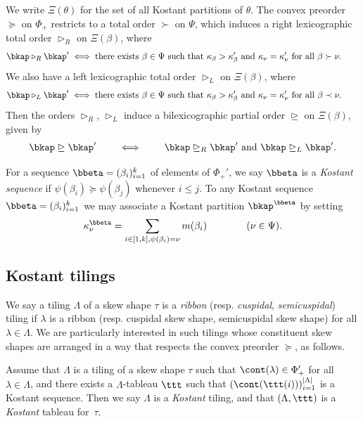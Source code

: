 We write \(\Xi(\theta)\) for the set of all Kostant partitions of \(\theta\).
The convex preorder \(\succeq\) on \(\Phi_+\) restricts to a total order \(\succ\) on \(\Psi\), which induces a right lexicographic total order \(\triangleright_R\) on \(\Xi(\beta)\), where
\begin{align*}
\bkap \triangleright_R \bkap'
\iff
\textup{there exists \(\beta \in \Psi\) such that }
\kappa_\beta > \kappa'_\beta \textup{ and } \kappa_\nu = \kappa'_\nu \textup{ for all } \beta \succ \nu.
\qquad
\end{align*}
We also have a 
left lexicographic total order \(\triangleright_L\) on \(\Xi(\beta)\), where
\begin{align*}
\bkap \triangleright_L \bkap'
\iff
\textup{there exists \(\beta \in \Psi\) such that }
\kappa_\beta > \kappa'_\beta \textup{ and } \kappa_\nu = \kappa'_\nu \textup{ for all } \beta \prec \nu.
\qquad
\end{align*}
Then the orders \(\triangleright_R\), \(\triangleright_L\) induce a bilexicographic partial order \(\trianglerighteq\) on \(\Xi(\beta)\), given by
\begin{align*}
\bkap \trianglerighteq \bkap'
\qquad
\iff
\qquad
\bkap \trianglerighteq_R \bkap'
\textup{ and }
\bkap \trianglerighteq_L \bkap'.
\end{align*}

For a sequence \(\bbeta = (\beta_i)_{i=1}^k\) of elements of \(\Phi_+'\), we say \(\bbeta\) is a {\em Kostant sequence} if \(\psi(\beta_i) \succeq \psi(\beta_j)\) whenever \(i \leq j\).
To any Kostant sequence \(\bbeta = (\beta_i)_{i=1}^k\) we may associate a Kostant partition \(\bkap^{\bbeta}\) by setting
\begin{align*}
\kappa^{\bbeta}_\nu = \sum_{ i\in [1,k], \psi(\beta_i) = \nu} m(\beta_i) \qquad \qquad(\nu \in \Psi).
\end{align*}


\subsection{Kostant tilings}
We say a tiling \(\Lambda\) of a skew shape \(\tau\) is a {\em ribbon} (resp. {\em cuspidal}, {\em semicuspidal}) tiling if \(\lambda\) is a ribbon (resp. cuspidal skew shape, semicuspidal skew shape) for all \(\lambda \in \Lambda\).
We are particularly interested in such tilings whose constituent skew shapes are arranged in a way that respects the convex preorder \(\succeq\), as follows.

\begin{defi}
Assume that \(\Lambda\) is a tiling of a skew shape \(\tau\) such that \(\cont(\lambda) \in \Phi_+'\) for all \(\lambda\in \Lambda\), and there exists a \(\Lambda\)-tableau \(\ttt\) such that \((\cont(\ttt(i)))_{i=1}^{|\Lambda|}\) is a Kostant sequence. Then we say \(\Lambda\) is a {\em Kostant} tiling, and that \((\Lambda,\ttt)\) is a {\em Kostant} tableau for~\(\tau\).
\end{defi}

